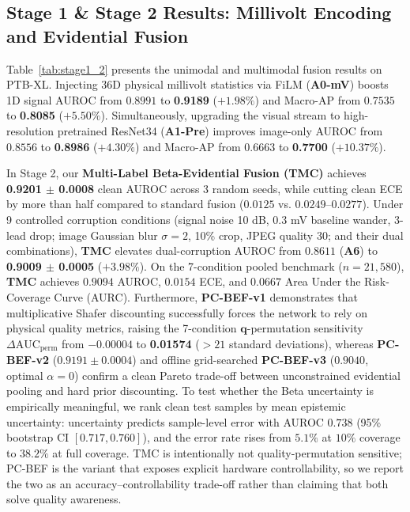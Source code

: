 \documentclass[preprint,12pt]{elsarticle}
\begin{document}
\subsection{Stage 1 \& Stage 2 Results: Millivolt Encoding and Evidential Fusion}
Table~\ref{tab:stage1_2} presents the unimodal and multimodal fusion results on PTB-XL. Injecting 36D physical millivolt statistics via FiLM (\textbf{A0-mV}) boosts 1D signal AUROC from $0.8991$ to \textbf{0.9189} ($+1.98\%$) and Macro-AP from $0.7535$ to \textbf{0.8085} ($+5.50\%$). Simultaneously, upgrading the visual stream to high-resolution pretrained ResNet34 (\textbf{A1-Pre}) improves image-only AUROC from $0.8556$ to \textbf{0.8986} ($+4.30\%$) and Macro-AP from $0.6663$ to \textbf{0.7700} ($+10.37\%$).

In Stage 2, our \textbf{Multi-Label Beta-Evidential Fusion (TMC)} achieves \textbf{0.9201 $\pm$ 0.0008} clean AUROC across 3 random seeds, while cutting clean ECE by more than half compared to standard fusion ($0.0125$ vs. $0.0249\text{--}0.0277$). Under 9 controlled corruption conditions (signal noise 10 dB, 0.3 mV baseline wander, 3-lead drop; image Gaussian blur $\sigma=2$, 10\% crop, JPEG quality 30; and their dual combinations), \textbf{TMC} elevates dual-corruption AUROC from $0.8611$ (\textbf{A6}) to \textbf{0.9009 $\pm$ 0.0005} ($+3.98\%$). On the 7-condition pooled benchmark ($n=21,580$), \textbf{TMC} achieves $0.9094$ AUROC, $0.0154$ ECE, and $0.0667$ Area Under the Risk-Coverage Curve (AURC). Furthermore, \textbf{PC-BEF-v1} demonstrates that multiplicative Shafer discounting successfully forces the network to rely on physical quality metrics, raising the 7-condition $\bm{q}$-permutation sensitivity $\Delta\text{AUC}_{\text{perm}}$ from $-0.00004$ to \textbf{0.01574} ($>21$ standard deviations), whereas \textbf{PC-BEF-v2} ($0.9191 \pm 0.0004$) and offline grid-searched \textbf{PC-BEF-v3} ($0.9040$, optimal $\alpha=0$) confirm a clean Pareto trade-off between unconstrained evidential pooling and hard prior discounting. To test whether the Beta uncertainty is empirically meaningful, we rank clean test samples by mean epistemic uncertainty: uncertainty predicts sample-level error with AUROC $0.738$ (95\% bootstrap CI $[0.717,0.760]$), and the error rate rises from $5.1\%$ at $10\%$ coverage to $38.2\%$ at full coverage. TMC is intentionally not quality-permutation sensitive; PC-BEF is the variant that exposes explicit hardware controllability, so we report the two as an accuracy--controllability trade-off rather than claiming that both solve quality awareness.
\end{document}
